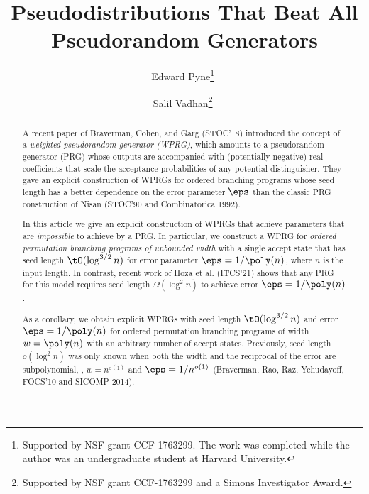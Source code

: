 \documentclass{toc}
\begin{document}
\begin{frontmatter}%

%
%
%

%
\title{Pseudodistributions That Beat All Pseudorandom 
Generators}  %

%
%

%
%
%
%
%
%

%
%
%
%
%
%
%
%
%
%
%
%


%
%
%
%

%

\author[pyne]{Edward Pyne\thanks{Supported by NSF grant CCF-1763299. The work was completed while the author was an undergraduate student at Harvard University.}\,\,}
\author[vadhan]{Salil Vadhan\thanks{Supported by NSF grant CCF-1763299 and a Simons Investigator Award.}\,\,}

%
%
%
%

%
%
%
%
%
%
%
%
\begin{abstract}
  A recent paper of Braverman, Cohen, and Garg (STOC'18) introduced the concept of a \emph{weighted pseudorandom generator (WPRG)}, which amounts to a pseudorandom generator (PRG) whose outputs are accompanied with (potentially negative) real coefficients that scale the acceptance probabilities of any potential distinguisher. They gave an explicit construction of WPRGs for ordered branching programs whose seed length has a better dependence on the error parameter $\eps$ than the classic PRG construction of Nisan (STOC'90 and Combinatorica 1992). 
    
  In this %
article  %
we give an explicit construction of WPRGs that achieve parameters that are \emph{impossible} to achieve by a PRG.  In particular, we construct a WPRG for \emph{ordered permutation branching programs of unbounded width} with a single accept state that has seed length $\tO(\log^{3/2} n)$ for error parameter $\eps=1/\poly(n)$, where $n$ is the input length.  In contrast, recent work of Hoza et al. (ITCS'21) shows that any PRG for this model requires seed length $\Omega(\log^2 n)$ to achieve error $\eps=1/\poly(n)$.
    
    As a corollary, we obtain explicit WPRGs with seed length $\tO(\log^{3/2} n)$ and error $\eps=1/\poly(n)$ for ordered permutation branching programs of width $w=\poly(n)$ with an arbitrary number of accept states.  Previously, seed length $o(\log^2 n)$ was only known when both the width and the reciprocal of the error are subpolynomial, \ie, $w=n^{o(1)}$ and $\eps=1/n^{o(1)}$ (Braverman, Rao, Raz, Yehudayoff, FOCS'10 and SICOMP 2014).
    

\end{abstract}
\end{frontmatter}
\end{document}
